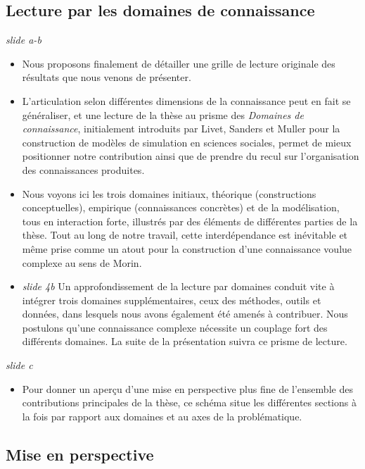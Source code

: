 \documentclass[11pt]{article}
\begin{document}
\subsection*{Lecture par les domaines de connaissance}

\textit{slide a-b}

\begin{itemize}
	\item Nous proposons finalement de détailler une grille de lecture originale des résultats que nous venons de présenter.
	\item L'articulation selon différentes dimensions de la connaissance peut en fait se généraliser, et une lecture de la thèse au prisme des \emph{Domaines de connaissance}, initialement introduits par Livet, Sanders et Muller pour la construction de modèles de simulation en sciences sociales, permet de mieux positionner notre contribution ainsi que de prendre du recul sur l'organisation des connaissances produites.
	\item Nous voyons ici les trois domaines initiaux, théorique (constructions conceptuelles), empirique (connaissances concrètes) et de la modélisation, tous en interaction forte, illustrés par des éléments de différentes parties de la thèse. Tout au long de notre travail, cette interdépendance est inévitable et même prise comme un atout pour la construction d'une connaissance voulue complexe au sens de Morin.
	\item \textit{slide 4b} Un approfondissement de la lecture par domaines conduit vite à intégrer trois domaines supplémentaires, ceux des méthodes, outils et données, dans lesquels nous avons également été amenés à contribuer. Nous postulons qu'une connaissance complexe nécessite un couplage fort des différents domaines. La suite de la présentation suivra ce prisme de lecture.
\end{itemize}

\textit{slide c}

\begin{itemize}
	\item  Pour donner un aperçu d'une mise en perspective plus fine de l'ensemble des contributions principales de la thèse, ce schéma situe les différentes sections à la fois par rapport aux domaines et au axes de la problématique.
\end{itemize}




\subsection*{Mise en perspective}
\end{document}
